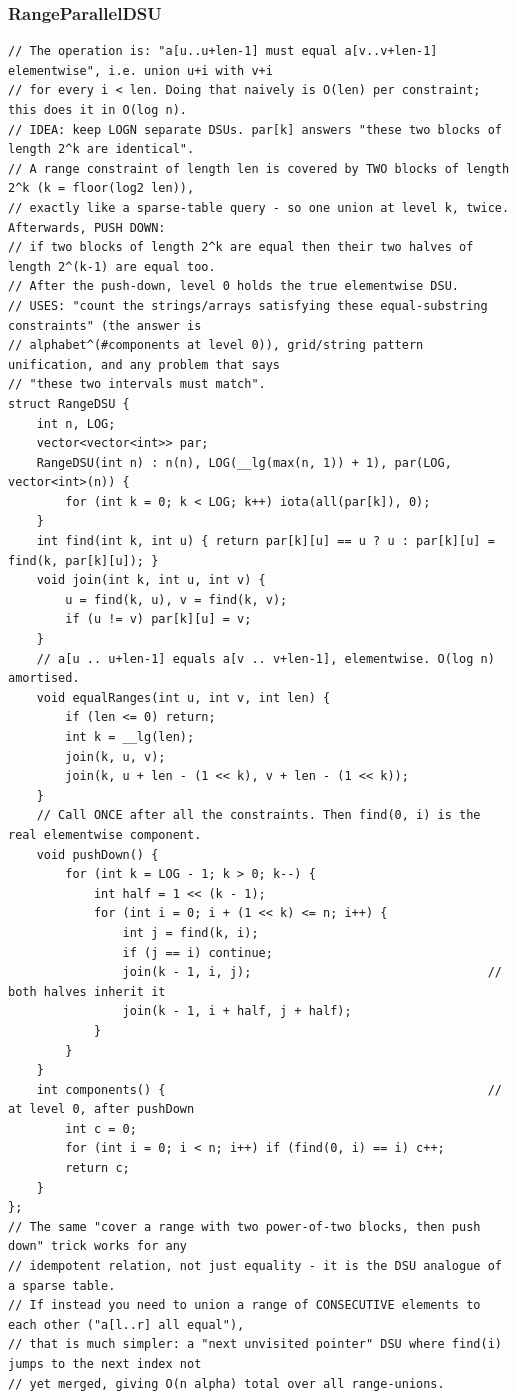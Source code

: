 \documentclass[9pt,a4paper,twocolumn]{extarticle}
\begin{document}
\subsubsection{RangeParallelDSU}
\nopagebreak
\begin{lstlisting}
// The operation is: "a[u..u+len-1] must equal a[v..v+len-1] elementwise", i.e. union u+i with v+i
// for every i < len. Doing that naively is O(len) per constraint; this does it in O(log n).
// IDEA: keep LOGN separate DSUs. par[k] answers "these two blocks of length 2^k are identical".
// A range constraint of length len is covered by TWO blocks of length 2^k (k = floor(log2 len)),
// exactly like a sparse-table query - so one union at level k, twice. Afterwards, PUSH DOWN:
// if two blocks of length 2^k are equal then their two halves of length 2^(k-1) are equal too.
// After the push-down, level 0 holds the true elementwise DSU.
// USES: "count the strings/arrays satisfying these equal-substring constraints" (the answer is
// alphabet^(#components at level 0)), grid/string pattern unification, and any problem that says
// "these two intervals must match".
struct RangeDSU {
    int n, LOG;
    vector<vector<int>> par;
    RangeDSU(int n) : n(n), LOG(__lg(max(n, 1)) + 1), par(LOG, vector<int>(n)) {
        for (int k = 0; k < LOG; k++) iota(all(par[k]), 0);
    }
    int find(int k, int u) { return par[k][u] == u ? u : par[k][u] = find(k, par[k][u]); }
    void join(int k, int u, int v) {
        u = find(k, u), v = find(k, v);
        if (u != v) par[k][u] = v;
    }
    // a[u .. u+len-1] equals a[v .. v+len-1], elementwise. O(log n) amortised.
    void equalRanges(int u, int v, int len) {
        if (len <= 0) return;
        int k = __lg(len);
        join(k, u, v);
        join(k, u + len - (1 << k), v + len - (1 << k));
    }
    // Call ONCE after all the constraints. Then find(0, i) is the real elementwise component.
    void pushDown() {
        for (int k = LOG - 1; k > 0; k--) {
            int half = 1 << (k - 1);
            for (int i = 0; i + (1 << k) <= n; i++) {
                int j = find(k, i);
                if (j == i) continue;
                join(k - 1, i, j);                                 // both halves inherit it
                join(k - 1, i + half, j + half);
            }
        }
    }
    int components() {                                             // at level 0, after pushDown
        int c = 0;
        for (int i = 0; i < n; i++) if (find(0, i) == i) c++;
        return c;
    }
};
// The same "cover a range with two power-of-two blocks, then push down" trick works for any
// idempotent relation, not just equality - it is the DSU analogue of a sparse table.
// If instead you need to union a range of CONSECUTIVE elements to each other ("a[l..r] all equal"),
// that is much simpler: a "next unvisited pointer" DSU where find(i) jumps to the next index not
// yet merged, giving O(n alpha) total over all range-unions.
\end{lstlisting}
\end{document}
